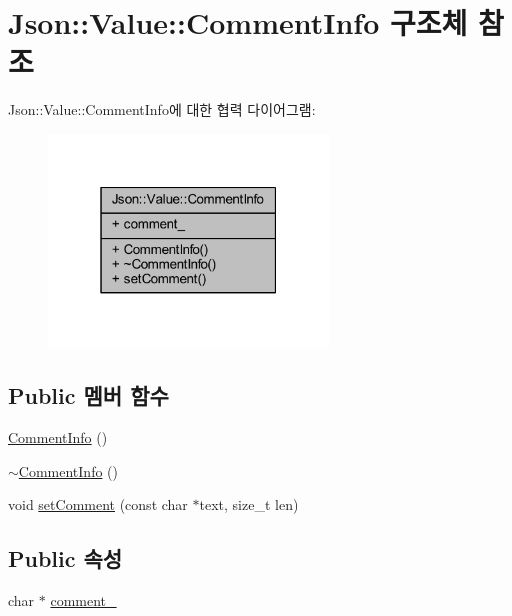 \hypertarget{struct_json_1_1_value_1_1_comment_info}{}\section{Json\+:\+:Value\+:\+:Comment\+Info 구조체 참조}
\label{struct_json_1_1_value_1_1_comment_info}


Json\+:\+:Value\+:\+:Comment\+Info에 대한 협력 다이어그램\+:\nopagebreak
\begin{figure}[H]
\begin{center}
\leavevmode
\includegraphics[width=211pt]{struct_json_1_1_value_1_1_comment_info__coll__graph}
\end{center}
\end{figure}
\subsection*{Public 멤버 함수}
\begin{DoxyCompactItemize}
\item 
\hyperlink{struct_json_1_1_value_1_1_comment_info_ab23b0c125695d284bded2fb106a49043}{Comment\+Info} ()
\item 
\hyperlink{struct_json_1_1_value_1_1_comment_info_ab4d0877190bdbf484e4e2a3bade42ac8}{$\sim$\+Comment\+Info} ()
\item 
void \hyperlink{struct_json_1_1_value_1_1_comment_info_a4d01c2cd8c07995969c5d636dfd4fa8c}{set\+Comment} (const char $\ast$text, size\+\_\+t len)
\end{DoxyCompactItemize}
\subsection*{Public 속성}
\begin{DoxyCompactItemize}
\item 
char $\ast$ \hyperlink{struct_json_1_1_value_1_1_comment_info_a020f19c7098bab8ec8fec14cd1a5afb9}{comment\+\_\+}
\end{DoxyCompactItemize}


